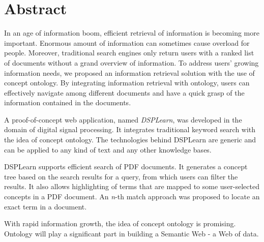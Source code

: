 \chapter*{Abstract}

In an age of information boom, efficient retrieval of information is becoming more important. Enormous amount of information can sometimes cause overload for people. Moreover, traditional search engines only return users with a ranked list of documents without a grand overview of information. To address users' growing information needs, we proposed an information retrieval solution with the use of concept ontology. By integrating information retrieval with ontology, users can effectively navigate among different documents and have a quick grasp of the information contained in the documents.

A proof-of-concept web application, named \textit{DSPLearn}, was developed in the domain of digital signal processing. It integrates traditional keyword search with the idea of concept ontology. The technologies behind DSPLearn are generic and can be applied to any kind of text and any other knowledge bases.

DSPLearn supports efficient search of PDF documents. It generates a concept tree based on the search results for a query, from which users can filter the results. It also allows highlighting of terms that are mapped to some user-selected concepts in a PDF document. An \textit{n}-th match approach was proposed to locate an exact term in a document.

With rapid information growth, the idea of concept ontology is promising. Ontology will play a significant part in building a Semantic Web - a Web of data.







